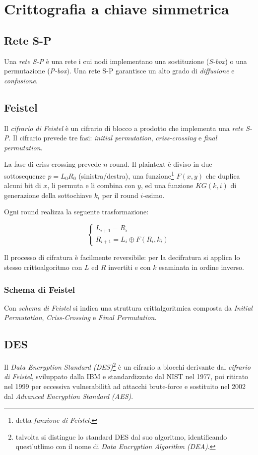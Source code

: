 \chapter{Crittografia a chiave simmetrica}
\label{chp:symmetric-key-cryptography}

\section{Rete S-P}
Una \textit{rete S-P} è una rete i cui nodi implementano una sostituzione (\textit{S-box}) o una permutazione (\textit{P-box}). Una rete S-P garantisce un alto grado di \textit{diffusione} e \textit{confusione}.

\section{Feistel}
Il \textit{cifrario di Feistel} è un cifrario di blocco a prodotto che implementa una \textit{rete S-P}.
Il cifrario prevede tre fasi: \textit{initial permutation}, \textit{criss-crossing} e \textit{final permutation}.

La fase di criss-crossing prevede $n$ round. Il plaintext è diviso in due sottosequenze $p=L_{0}R_{0}$ (sinistra/destra), una funzione\footnote{detta \textit{funzione di Feistel}.} $F(x,y)$ che duplica alcuni bit di $x$, li permuta e li combina con $y$, ed una funzione $KG(k,i)$ di generazione della sottochiave $k_{i}$ per il round $i$-esimo.

Ogni round realizza la seguente trasformazione:

\begin{equation}
\begin{cases}
  L_{i+1}=R_{i}\\
  R_{i+1}=L_{i} \oplus F(R_{i},k_{i})
\end{cases}
\end{equation}

Il processo di cifratura è facilmente reversibile: per la decifratura si applica lo stesso crittoalgoritmo con $L$ ed $R$ invertiti e con $k$ esaminata in ordine inverso.


\subsection{Schema di Feistel}
Con \textit{schema di Feistel} si indica una struttura crittalgoritmica composta da \textit{Initial Permutation}, \textit{Criss-Crossing} e \textit{Final Permutation}.

\section{DES}
Il \textit{Data Encryption Standard (DES)}\footnote{talvolta si distingue lo standard DES dal suo algoritmo, identificando quest'utlimo con il nome di \textit{Data Encryption Algorithm (DEA)}.} è un cifrario a blocchi derivante dal \textit{cifrario di Feistel}, sviluppato dalla IBM e standardizzato dal NIST nel 1977, poi ritirato nel 1999 per eccessiva vulnerabilità ad attacchi brute-force e sostituito nel 2002 dal \textit{Advanced Encryption Standard (AES)}.

